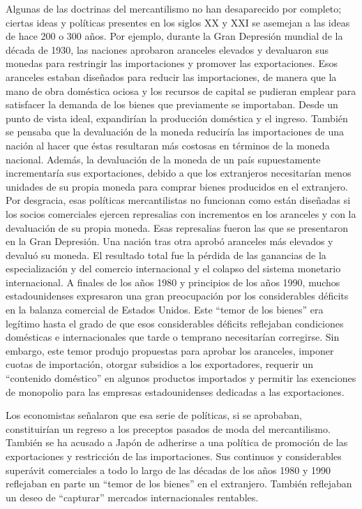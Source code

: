 \documentclass[
  jou,
  floatsintext,
  longtable,
  a4paper,
  nolmodern,
  notxfonts,
  notimes,
  colorlinks=true,linkcolor=blue,citecolor=blue,urlcolor=blue]{apa7}
\begin{document}
Algunas de las doctrinas del mercantilismo no han desaparecido por
completo; ciertas ideas y políticas presentes en los siglos XX y XXI se
asemejan a las ideas de hace 200 o 300 años. Por ejemplo, durante la
Gran Depresión mundial de la década de 1930, las naciones aprobaron
aranceles elevados y devaluaron sus monedas para restringir las
importaciones y promover las exportaciones. Esos aranceles estaban
diseñados para reducir las importaciones, de manera que la mano de obra
doméstica ociosa y los recursos de capital se pudieran emplear para
satisfacer la demanda de los bienes que previamente se importaban. Desde
un punto de vista ideal, expandirían la producción doméstica y el
ingreso. También se pensaba que la devaluación de la moneda reduciría
las importaciones de una nación al hacer que éstas resultaran más
costosas en términos de la moneda nacional. Además, la devaluación de la
moneda de un país supuestamente incrementaría sus exportaciones, debido
a que los extranjeros necesitarían menos unidades de su propia moneda
para comprar bienes producidos en el extranjero. Por desgracia, esas
políticas mercantilistas no funcionan como están diseñadas si los socios
comerciales ejercen represalias con incrementos en los aranceles y con
la devaluación de su propia moneda. Esas represalias fueron las que se
presentaron en la Gran Depresión. Una nación tras otra aprobó aranceles
más elevados y devaluó su moneda. El resultado total fue la pérdida de
las ganancias de la especialización y del comercio internacional y el
colapso del sistema monetario internacional. A finales de los años 1980
y principios de los años 1990, muchos estadounidenses expresaron una
gran preocupación por los considerables déficits en la balanza comercial
de Estados Unidos. Este ``temor de los bienes'' era legítimo hasta el
grado de que esos considerables déficits reflejaban condiciones
domésticas e internacionales que tarde o temprano necesitarían
corregirse. Sin embargo, este temor produjo propuestas para aprobar los
aranceles, imponer cuotas de importación, otorgar subsidios a los
exportadores, requerir un ``contenido doméstico'' en algunos productos
importados y permitir las exenciones de monopolio para las empresas
estadounidenses dedicadas a las exportaciones.

Los economistas señalaron que esa serie de políticas, si se aprobaban,
constituirían un regreso a los preceptos pasados de moda del
mercantilismo. También se ha acusado a Japón de adherirse a una política
de promoción de las exportaciones y restricción de las importaciones.
Sus continuos y considerables superávit comerciales a todo lo largo de
las décadas de los años 1980 y 1990 reflejaban en parte un ``temor de
los bienes'' en el extranjero. También reflejaban un deseo de
``capturar'' mercados internacionales rentables.
\end{document}
